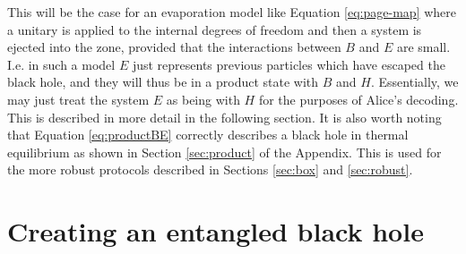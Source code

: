 \documentclass[11pt,a4paper]{article}
\begin{document}
This will be the case for an evaporation model like Equation \eqref{eq:page-map} where a unitary is applied to the internal degrees of freedom and then a system is ejected into the zone, provided that the interactions between $B$ and $E$ are small. I.e. in such a model $E$ just represents previous particles which have escaped the black hole, and they will thus be in a product state with $B$ and $H$. Essentially, we may just treat the system $E$ as being with $H$ for the purposes of Alice's decoding. This is described in more detail in the following section. It is also worth noting
that Equation \eqref{eq:productBE} correctly describes a black hole in thermal equilibrium as shown in Section \ref{sec:product} of the Appendix. This is used for the more robust protocols described in Sections \ref{sec:box} and \ref{sec:robust}.

\section{Creating an entangled black hole}
\label{sec:entangledbh}
\end{document}
